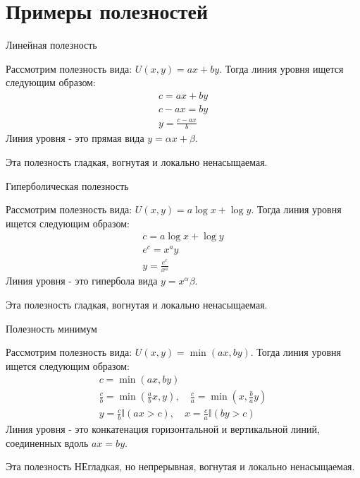 \documentclass{beamer}
\begin{document}
\section{Примеры полезностей}

\begin{frame}{Линейная полезность}

Рассмотрим полезность вида: $U(x, y) = ax + by$. Тогда линия уровня ищется следующим образом: 
\begin{gather*}
c = ax + by\\
c-ax = by\\
y = \frac{c-ax}{b}
\end{gather*}
Линия уровня - это прямая вида $y = \alpha x + \beta$.

Эта полезность гладкая, вогнутая и локально ненасыщаемая.

\end{frame}

\begin{frame}{Гиперболическая полезность}

Рассмотрим полезность вида: $U(x, y) = a \log x + \log y$. Тогда линия уровня ищется следующим образом: 
\begin{gather*}
c =  a \log x + \log y\\
e^{c} = x^a y\\
y =\frac{e^{c}}{x^a}
\end{gather*}
Линия уровня - это гипербола вида $y = x^\alpha \beta$.

Эта полезность гладкая, вогнутая и локально ненасыщаемая.

\end{frame}

\begin{frame}{Полезность минимум}

Рассмотрим полезность вида: $U(x, y) = \min(ax, by)$. Тогда линия уровня ищется следующим образом: 
\begin{gather*}
c = \min(ax, by)\\
\frac{c}{b}= \min(\frac{a}{b}x, y), \quad \frac{c}{a}= \min(x, \frac{b}{a}y)\\
y = \frac{c}{b} \mathbb{I}(ax > c), \quad x = \frac{c}{a} \mathbb{I}(by > c)
\end{gather*}
Линия уровня - это конкатенация горизонтальной и вертикальной линий, соединенных вдоль $ax = by$.

Эта полезность НЕгладкая, но непрерывная, вогнутая и локально ненасыщаемая.

\end{frame}
\end{document}
